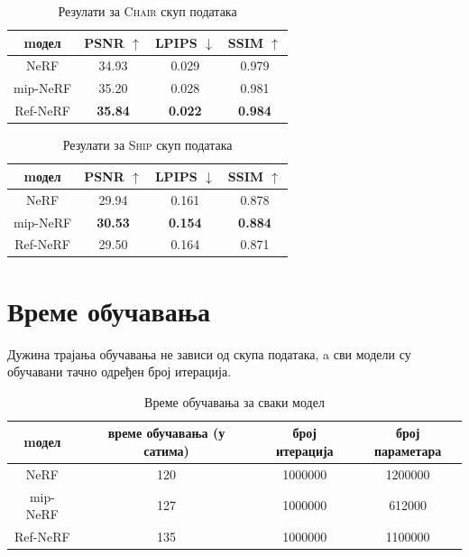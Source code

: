 \documentclass[12pt, a4paper, twoside]{book}
\numberwithin{equation}{chapter}
\numberwithin{theorem}{section}
\numberwithin{definition}{section}
\numberwithin{definitionChapter}{chapter}
\begin{document}
	\begin{table}[H]
		\centering
		\begin{tabular}{cccc} \toprule
			{mодел} 		& {PSNR $\uparrow$} & {LPIPS $\downarrow$}	& {SSIM $\uparrow$} \\ \midrule
			{NeRF} 			& 34.93				& 0.029					& 0.979 \\ 
			{mip-NeRF} 		& 35.20				& 0.028					& 0.981 \\
			{Ref-NeRF}		& \textbf{35.84}	& \textbf{0.022}		& \textbf{0.984} \\ \bottomrule
		\end{tabular}
		\caption{Резулати за \textsc{Chair} скуп података}
		\label{table-chair}
	\end{table}

	\begin{table}[H]
		\centering
		\begin{tabular}{cccc} \toprule
			{mодел}			& {PSNR $\uparrow$} & {LPIPS $\downarrow$}	& {SSIM $\uparrow$} \\ \midrule
			{NeRF}			& 29.94				& 0.161					& 0.878 \\ 
			{mip-NeRF}		& \textbf{30.53} 	& \textbf{0.154}		& \textbf{0.884} \\
			{Ref-NeRF}		& 29.50				& 0.164					& 0.871 \\ \bottomrule
		\end{tabular}
		\caption{Резулати за \textsc{Ship} скуп података}
		\label{table-ship}
	\end{table}

\section{Време обучавања}

Дужина трајања обучавања не зависи од скупа података, a сви модели су обучавани тачно одређен број итерација.

	\begin{table}[H]
		\centering
		\begin{tabular}{cccc} \toprule
			{mодел} 	& {време обучавања (у сатима)} 	& {број итерација} & {број параметара} \\ \midrule
			{NeRF} 		& 120 							& 1000000 & 1200000\\ 
			{mip-NeRF} 	& 127 							& 1000000 & 612000\\
			{Ref-NeRF} 	& 135 							& 1000000 & 1100000\\ \bottomrule
		\end{tabular}
		\caption{Време обучавања за сваки модел}
		\label{table-duration}
	\end{table}
\end{document}
